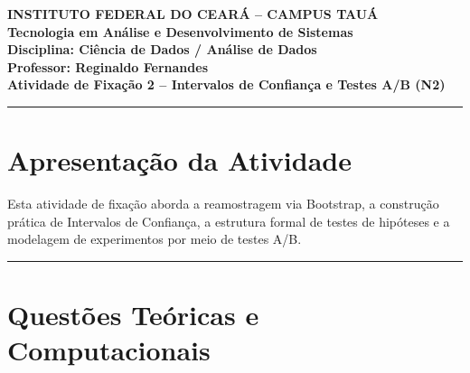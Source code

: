 \documentclass[12pt]{article}
\begin{document}
\begin{center}
    \vspace{0.5cm}
    \textbf{INSTITUTO FEDERAL DO CEARÁ -- CAMPUS TAUÁ} \\
    \textbf{Tecnologia em Análise e Desenvolvimento de Sistemas} \\
    \textbf{Disciplina: Ciência de Dados / Análise de Dados} \\
    \textbf{Professor: Reginaldo Fernandes} \\
    \vspace{0.5cm}
    \large{\textbf{Atividade de Fixação 2 -- Intervalos de Confiança e Testes A/B (N2)}}
    \vspace{0.3cm}
\end{center}

\hrule
\vspace{0.4cm}

\section*{Apresentação da Atividade}
Esta atividade de fixação aborda a reamostragem via Bootstrap, a construção prática de Intervalos de Confiança, a estrutura formal de testes de hipóteses e a modelagem de experimentos por meio de testes A/B.

\vspace{0.3cm}
\hrule
\vspace{0.5cm}

\section*{Questões Teóricas e Computacionais}
\end{document}
